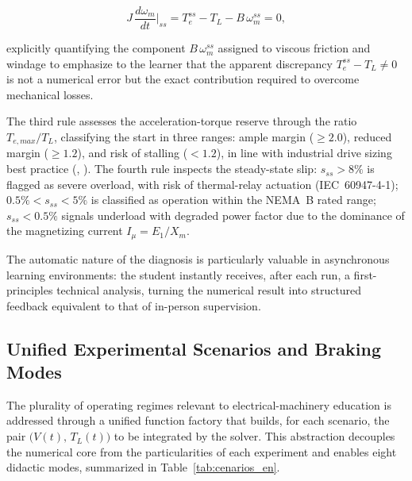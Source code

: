 \documentclass[a4paper]{ifacconf}
\begin{document}
\begin{equation}
\label{eq:balanco_torques_en}
J\,\frac{d\omega_m}{dt}\bigg|_{ss} = T_e^{ss} - T_L - B\,\omega_m^{ss} = 0,
\end{equation}

\noindent explicitly quantifying the component $B\,\omega_m^{ss}$ assigned to viscous friction and windage to emphasize to the learner that the apparent discrepancy $T_e^{ss} - T_L \neq 0$ is not a numerical error but the exact contribution required to overcome mechanical losses.

The third rule assesses the acceleration-torque reserve through the ratio $T_{e,max}/T_L$, classifying the start in three ranges: ample margin ($\geq 2.0$), reduced margin ($\geq 1.2$), and risk of stalling ($<1.2$), in line with industrial drive sizing best practice (\citeauthor{singh2015}, \citeyear{singh2015}). The fourth rule inspects the steady-state slip: $s_{ss} > 8\%$ is flagged as severe overload, with risk of thermal-relay actuation (IEC~60947-4-1); $0.5\% < s_{ss} < 5\%$ is classified as operation within the NEMA~B rated range; $s_{ss} < 0.5\%$ signals underload with degraded power factor due to the dominance of the magnetizing current $I_\mu = E_1/X_m$.

The automatic nature of the diagnosis is particularly valuable in asynchronous learning environments: the student instantly receives, after each run, a first-principles technical analysis, turning the numerical result into structured feedback equivalent to that of in-person supervision.

\subsection{Unified Experimental Scenarios and Braking Modes}
\label{subsec:scenarios_en}

The plurality of operating regimes relevant to electrical-machinery education is addressed through a unified function factory that builds, for each scenario, the pair $\bigl(V(t),\,T_L(t)\bigr)$ to be integrated by the solver. This abstraction decouples the numerical core from the particularities of each experiment and enables eight didactic modes, summarized in Table~\ref{tab:cenarios_en}.
\end{document}
